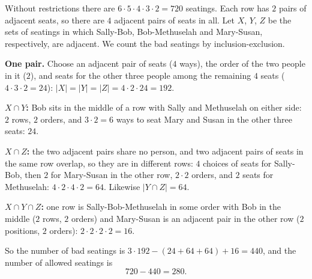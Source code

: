 Without restrictions there are $6\cdot5\cdot4\cdot3\cdot2=720$ seatings. Each row has $2$ pairs of adjacent seats, so there are $4$ adjacent pairs of seats in all. Let $X$, $Y$, $Z$ be the sets of seatings in which Sally-Bob, Bob-Methuselah and Mary-Susan, respectively, are adjacent. We count the bad seatings by inclusion-exclusion.

\textbf{One pair.} Choose an adjacent pair of seats ($4$ ways), the order of the two people in it ($2$), and seats for the other three people among the remaining $4$ seats ($4\cdot3\cdot2=24$): $|X|=|Y|=|Z|=4\cdot2\cdot24=192$.

\textbf{$X\cap Y$:} Bob sits in the middle of a row with Sally and Methuselah on either side: $2$ rows, $2$ orders, and $3\cdot2=6$ ways to seat Mary and Susan in the other three seats: $24$.

\textbf{$X\cap Z$:} the two adjacent pairs share no person, and two adjacent pairs of seats in the same row overlap, so they are in different rows: $4$ choices of seats for Sally-Bob, then $2$ for Mary-Susan in the other row, $2\cdot2$ orders, and $2$ seats for Methuselah: $4\cdot2\cdot4\cdot2=64$. Likewise $|Y\cap Z|=64$.

\textbf{$X\cap Y\cap Z$:} one row is Sally-Bob-Methuselah in some order with Bob in the middle ($2$ rows, $2$ orders) and Mary-Susan is an adjacent pair in the other row ($2$ positions, $2$ orders): $2\cdot2\cdot2\cdot2=16$.

So the number of bad seatings is $3\cdot192-(24+64+64)+16=440$, and the number of allowed seatings is
\[720-440=\boxed{280}.\]
